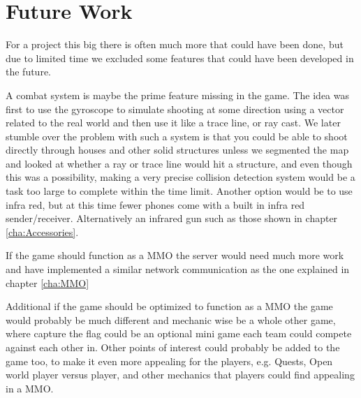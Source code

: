 \chapter{Future Work}
\label{cha:FutureWork}

For a project this big there is often much more that could have been done, but due to limited time we excluded some features that could have been developed in the future. 

A combat system is maybe the prime feature missing in the game. The idea was first to use the gyroscope to simulate shooting at some direction using a vector related to the real world and then use it like a trace line, or ray cast. We later stumble over the problem with such a system is that you could be able to shoot directly through houses and other solid structures unless we segmented the map and looked at whether a ray or trace line would hit a structure, and even though this was a possibility, making a very precise collision detection system would be a task too large to complete within the time limit. Another option would be to use infra red, but at this time fewer phones come with a built in infra red sender/receiver. Alternatively an infrared gun such as those shown in chapter \ref{cha:Accessories}.

If the game should function as a MMO the server would need much more work and have implemented a similar network communication as the one explained in chapter \ref{cha:MMO}

Additional if the game should be optimized to function as a MMO the game would probably be much different and mechanic wise be a whole other game, where capture the flag could be an optional mini game each team could compete against each other in. Other points of interest could probably be added to the game too, to make it even more appealing for the players, e.g. Quests, Open world player versus player, and other mechanics that players could find appealing in a MMO.